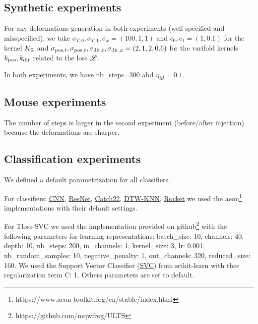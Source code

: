 \subsection{Synthetic experiments}
\label{appendix:numerics_synthetic}
For any deformations generation in both experiments (well-specified and misspecified), we take $\sigma_{T,0},\sigma_{T,1},\sigma_x=(100,1,1)$ and $c_0,c_1=(1,0.1)$ for the kernel $K_{\mathsf{G}}$
and $\sigma_{\mathrm{pos},t}, \sigma_{\mathrm{pos},t}, \sigma_{\mathrm{dir},t}, \sigma_{\mathrm{dir},x}=(2,1,2,0.6) $ for the varifold kernels $k_{\mathrm{pos}},k_{\mathrm{dir}}$ related to the loss $\mathscr{L}$.

In both experiments, we have nb\_steps=300 abd $\eta_M=0.1$.

\subsection{Mouse experiments}
The number of steps is larger in the second experiment (before/after injection) because the deformations are sharper.

\subsection{Classification experiments}
\label{appendix:classification_implementation}

We defined a default parametrization for all classifiers. 

For classifiers: \href{https://www.aeon-toolkit.org/en/stable/api_reference/auto_generated/aeon.classification.deep_learning.CNNClassifier.html#aeon.classification.deep_learning.CNNClassifier}{CNN}, 
\href{https://www.aeon-toolkit.org/en/stable/api_reference/auto_generated/aeon.networks.ResNetNetwork.html#aeon.networks.ResNetNetwork}{ResNet}, 
\href{https://www.aeon-toolkit.org/en/stable/api_reference/auto_generated/aeon.classification.feature_based.Catch22Classifier.html#aeon.classification.feature_based.Catch22Classifier}{Catch22}, 
\href{https://www.aeon-toolkit.org/en/stable/api_reference/auto_generated/aeon.classification.distance_based.KNeighborsTimeSeriesClassifier.html#aeon.classification.distance_based.KNeighborsTimeSeriesClassifier}{DTW-KNN}, 
\href{https://www.aeon-toolkit.org/en/stable/api_reference/auto_generated/aeon.classification.convolution_based.RocketClassifier.html#aeon.classification.convolution_based.RocketClassifier}{Rocket}
we used the aeon\footnote{https://www.aeon-toolkit.org/en/stable/index.html} implementations with their default settings. 

For Tloss-SVC we used the implementation provided on github\footnote{https://github.com/mqwfrog/ULTS} 
with the following parameters for learning representations: batch\_size: 10, channels: 40, depth: 10, nb\_steps: 200, in\_channels: 1, 
kernel\_size: 3, lr: 0.001, nb\_random\_samples: 10, negative\_penalty: 1, out\_channels: 320, reduced\_size: 160. 
We used the Support Vector Classifier (\href{https://scikit-learn.org/stable/modules/generated/sklearn.svm.SVC.html#sklearn.svm.SVC}{SVC})
from scikit-learn with thee regularization term C: 1. Others parameters are set to default.

